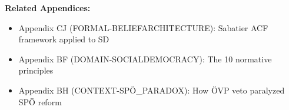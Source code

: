 
\begin{tcolorbox}[colback=orange!5!white, colframe=orange!75!black,
    title=Cross-Reference Links]

\textbf{Related Appendices:}
\begin{itemize}[nosep]
\item Appendix CJ (FORMAL-BELIEFARCHITECTURE): Sabatier ACF framework applied to SD
\item Appendix BF (DOMAIN-SOCIALDEMOCRACY): The 10 normative principles
\item Appendix BH (CONTEXT-SPÖ_PARADOX): How ÖVP veto paralyzed SPÖ reform
\end{itemize}

\end{tcolorbox}


